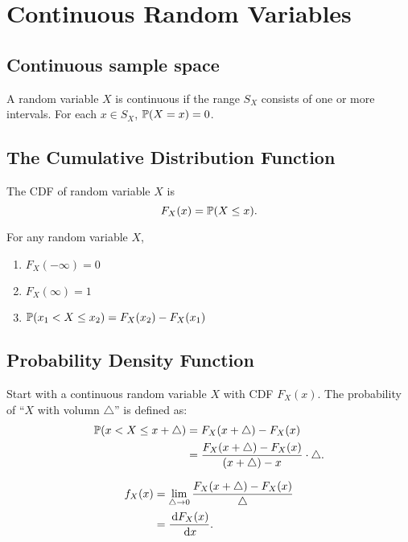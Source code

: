 \chapter{Continuous Random Variables}


\section{Continuous sample space} 
\begin{axiom}
    A random variable $X$ is continuous if the range $S_X$ consists of one or more intervals. For each $x\in S_X$, $\P{X=x}=0$. 
\end{axiom}


\section{The Cumulative Distribution Function}
\begin{definition}
    The CDF of random variable $X$ is 
    \[F_X(x) = \P{X\leq x}.\]
\end{definition}

\begin{theorem}
    For any random variable $X$,
    \begin{enumerate}
        \item $F_X(-\infty)=0$
        \item $F_X(\infty)=1$
        \item $\P{x_1<X\leq x_2} = F_X(x_2)-F_X(x_1)$
    \end{enumerate}
\end{theorem}


\section{Probability Density Function}
Start with a continuous random variable $X$ with CDF $F_X(x)$. The probability of ``$X$ with volumn $\triangle$'' is defined as:
\begin{align*}
    \P{x<X\leq x+\triangle} 
    &= F_X(x+\triangle)-F_X(x) \\
    &= \frac{F_X(x+\triangle)-F_X(x)}{(x+\triangle)-x}\cdot\triangle.
\end{align*}
\begin{definition} 
    \begin{align*}
        f_X(x) 
        &= \lim_{\triangle\rightarrow 0}\frac{F_X(x+\triangle)-F_X(x)}{\triangle} \\
        &= \frac{\,\mathrm{d} F_X(x)}{\,\mathrm{d} x}.
    \end{align*}
\end{definition}

